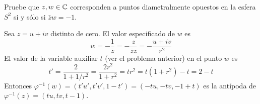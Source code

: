 \begin{exercise}
Pruebe que $z, w \in \mathbb C$ corresponden a puntos diametralmente opuestos en la esfera $S^2$ si y sólo si $\bar zw = -1$.
\end{exercise}

\begin{solution}
Sea $z = u + iv$ distinto de cero. El valor especificado de $w$ es
$$w = -\frac 1 {\bar z} = -\frac z {\bar zz} = -\frac {u + iv} {r^2}$$
El valor de la variable auxiliar $t$ (ver el problema anterior) en el punto $w$ es
$$t' = \frac 2 {1 + 1/r^2} = \frac {2r^2} {1 + r^2} = tr^2 = t(1 + r^2) - t = 2 - t$$
Entonces $\varphi^{-1}(w) = (t'u', t'v', 1 - t') = (-tu, -tv, -1+t)$ es la antípoda de $\varphi^{-1}(z) = (tu, tv, t-1)$.
\end{solution}
